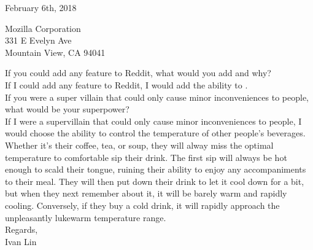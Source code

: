 \documentclass[12pt]{deedy-resume-openfont}
\begin{document}
%
%
\sectionsep

\selectfont
\raggedright

February 6th, 2018\\
\sectionsep

Mozilla Corporation\\
331 E Evelyn Ave\\
Mountain View, CA 94041
\sectionsep

If you could add any feature to Reddit, what would you add and why?\\

If I could add any feature to Reddit, I would add the ability to .\\

If you were a super villain that could only cause minor inconveniences to people, what would be your superpower?\\

If I were a supervillain that could only cause minor inconveniences to people, I would choose the ability to control the temperature of other people's beverages. Whether it's their coffee, tea, or soup, they will alway miss the optimal temperature to comfortable sip their drink. The first sip will always be hot enough to scald their tongue, ruining their ability to enjoy any accompaniments to their meal. They will then put down their drink to let it cool down for a bit, but when they next remember about it, it will be barely warm and rapidly cooling. Conversely, if they buy a cold drink, it will rapidly approach the unpleasantly lukewarm temperature range.\\

Regards,\\
Ivan Lin
\end{document}
